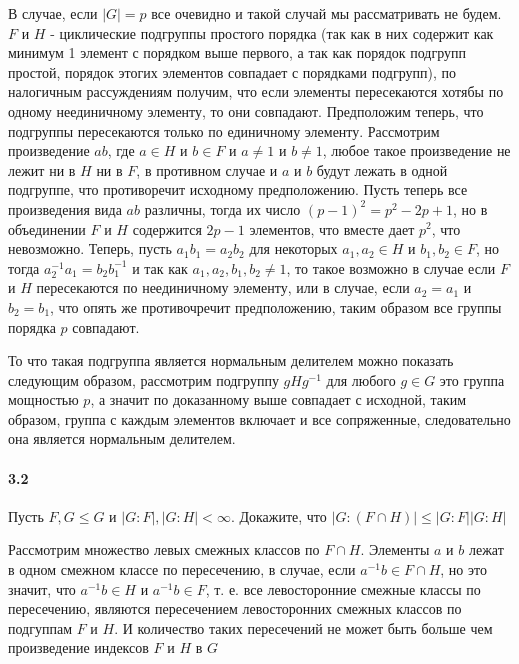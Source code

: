 \documentclass[a4paper,12pt]{article}
\begin{document}
\begin{Solution}
В случае, если $|G| = p$ все очевидно и такой случай мы рассматривать не будем. $F$ и $H$ - циклические подгруппы простого порядка (так как в них содержит как минимум 1 элемент с порядком выше первого, а так как порядок подгрупп простой, порядок этогих элементов совпадает с порядками подгрупп), по налогичным рассуждениям получим, что если элементы пересекаются хотябы по одному неединичному элементу, то они совпадают. Предположим теперь, что подгруппы пересекаются только по единичному элементу. Рассмотрим произведение $ab$, где $a \in H$ и $b \in F$ и $a \not= 1$ и $b \not= 1$, любое такое произведение не лежит ни в $H$ ни в $F$, в противном случае и $a$ и $b$ будут лежать в одной подгруппе, что противоречит исходному предположению. Пусть теперь все произведения вида $ab$ различны, тогда их число $(p-1)^2 = p^2 - 2p + 1$, но в объединении $F$ и $H$ содержится $2p-1$ элементов, что вместе дает $p^2$, что невозможно. Теперь, пусть $a_1b_1 = a_2b_2$ для некоторых $a_1,a_2 \in H$ и $b_1,b_2 \in F$, но тогда $a_2^{-1}a_1 = b_2b_1^{-1}$ и так как $a_1, a_2, b_1, b_2 \not= 1$, то такое возможно в случае если $F$ и $H$ пересекаются по неединичному элементу, или в случае, если $a_2 = a_1$ и $b_2 = b_1$, что опять же противочречит предположению, таким образом все группы порядка $p$ совпадают.

То что такая подгруппа является нормальным делителем можно показать следующим образом, рассмотрим подгруппу $gHg^{-1}$ для любого $g \in G$ это группа мощностью $p$, а значит по доказанному выше совпадает с исходной, таким образом, группа с каждым элементов включает и все сопряженные, следовательно она является нормальным делителем.
\end{Solution}

\paragraph{3.2} Пусть $F,G \le G$ и $|G:F|, |G:H| < \infty$. Докажите, что $|G:\left(F\cap H\right)| \le |G:F||G:H|$

\begin{Solution}
Рассмотрим множество левых смежных классов по $F \cap H$. Элементы $a$ и $b$ лежат в одном смежном классе по пересечению, в случае, если $a^{-1}b \in F \cap H$, но это значит, что $a^{-1}b \in H$ и $a^{-1}b \in F$, т. е. все левосторонние смежные классы по пересечению, являются пересечением левосторонних смежных классов по подгуппам $F$ и $H$. И количество таких пересечений не может быть больше чем произведение индексов $F$ и $H$ в $G$
\end{Solution}
\end{document}
